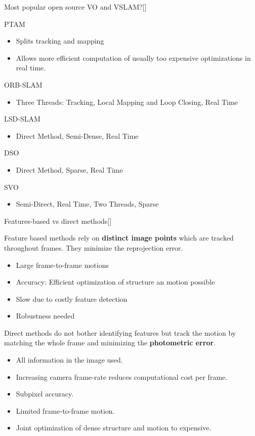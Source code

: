 \documentclass[10pt,a4paper]{scrartcl}
\begin{document}
\begin{multicols*}{2}
\begin{QandA}{Most popular open source VO and VSLAM?}[\Comparison]
\item[(VSLAM)] PTAM
\begin{itemize}
\item Splits tracking and mapping
\item Allows more efficient computation of usually too expensive optimizations in real time.
\end{itemize}
\item[(VSLAM)] ORB-SLAM
\begin{itemize}
\item Three Threads: Tracking, Local Mapping and Loop Closing, Real Time
\end{itemize}
\item[(VSLAM)] LSD-SLAM
\begin{itemize}
\item Direct Method, Semi-Dense, Real Time
\end{itemize}
\item[(VO)] DSO
\begin{itemize}
\item Direct Method, Sparse, Real Time
\end{itemize}
\item[(VO)] SVO
\begin{itemize}
\item Semi-Direct, Real Time, Two Threads, Sparse
\end{itemize}
\end{QandA}

\begin{QandA}
{Features-based vs direct methods}[\Comparison]
\item Feature based methods rely on \textbf{distinct image points} which are tracked throughout frames. They minimize the reprojection error. 
\begin{itemize}
\item[+] Large frame-to-frame motions
\item[+] Accuracy: Efficient optimization of structure an motion possible
\item[-] Slow due to costly feature detection
\item[-] Robustness needed
\end{itemize}
\item Direct methods do not bother identifying features but track the motion by matching the whole frame and minimizing the \textbf{photometric error}.
\begin{itemize}
\item[+] All information in the image used.
\item[+] Increasing camera frame-rate reduces computational cost per frame.
\item[+] Subpixel accuracy.
\item[-] Limited frame-to-frame motion.
\item[-] Joint optimization of dense structure and motion to expensive.
\end{itemize}
\end{QandA}


\end{multicols*}
\end{document}
